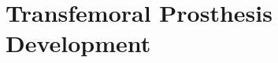 \chapter{Transfemoral Prosthesis Development}\label{sec:pros_design}

\graphicspath{{chapters/prosthesis_design/figures/}}




